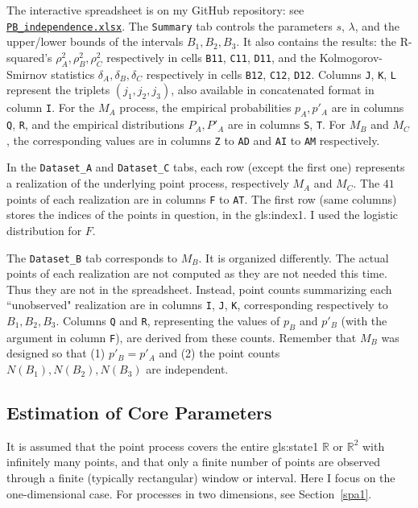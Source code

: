 \documentclass[10pt]{article}
\begin{document}

\noindent The interactive spreadsheet is on my GitHub repository: 
see  \href{https://github.com/VincentGranville/Point-Processes/tree/main/Spreadsheets}{\texttt{PB\_independence.xlsx}}. The \texttt{Summary} tab controls the parameters $s$, $\lambda$, and the upper/lower bounds of the intervals $B_1,B_2,B_3$. It also contains
the results: the R-squared's $\rho_A^2,\rho_B^2,\rho_C^2$ respectively in cells \texttt{B11}, \texttt{C11}, \texttt{D11}, and 
the Kolmogorov-Smirnov statistics $\delta_A,\delta_B,\delta_C$ respectively in cells \texttt{B12}, \texttt{C12}, \texttt{D12}.  Columns \texttt{J}, \texttt{K}, \texttt{L} represent the triplets
$(j_1,j_2,j_3)$, also available in concatenated format in column \texttt{I}. For the $M_A$ process, the 
empirical probabilities $p_A,p'_A$ are
in columns \texttt{Q}, \texttt{R}, and the empirical distributions $P_A,P'_A$ are in columns \texttt{S}, \texttt{T}. For $M_B$ and $M_C$, the corresponding values are in
columns \texttt{Z} to \texttt{AD} and \texttt{AI} to \texttt{AM} respectively.

In the \texttt{Dataset\_A} and \texttt{Dataset\_C} tabs, each row (except the first one) represents a realization of the underlying point process, respectively
$M_A$ and $M_C$. The $41$ points of each realization are in columns \texttt{F} to \texttt{AT}.  The first row (same columns) stores the indices of the points in question, in the \gls{gls:index1}. I used the logistic distribution for $F$. 

The \texttt{Dataset\_B} tab corresponds to $M_B$. It is organized
differently. The actual points of each realization are not computed as they are not needed this time. Thus they are not in the spreadsheet. Instead, point counts summarizing each ``unobserved" realization are in columns \texttt{I}, \texttt{J}, \texttt{K}, corresponding respectively to $B_1, B_2, B_3$. 
Columns \texttt{Q} and \texttt{R}, representing the values of $p_B$ and $p'_B$ (with the argument in column \texttt{F}), are derived from these counts. Remember that $M_B$ was designed so that (1) $p'_B=p'_A$ and (2) the point counts $N(B_1), N(B_2), N(B_3)$ are independent.


\subsection{Estimation of Core Parameters}\label{estpar}
It is assumed that the point process covers the entire \gls{gls:state1} $\mathbb{R}$ or $\mathbb{R}^2$ with infinitely many points,  and that only a finite number of points are observed through a finite (typically rectangular) window or interval.  Here I focus on the one-dimensional case. For processes in two dimensions, see Section~\ref{spa1}.
\end{document}
